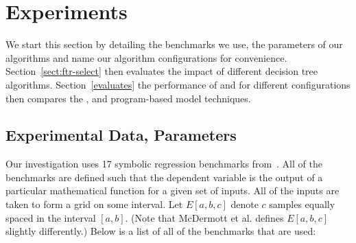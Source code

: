
\section{Experiments}\label{sect:experiments}

We start this section by detailing the benchmarks we use, the parameters of our algorithms and name our algorithm configurations for convenience. Section~\ref{sect:ftr-select} then evaluates the impact of different decision tree algorithms. Section~\ref{evaluates} the performance of \FULL and \DRAW for different configurations then compares the \FULL, \DRAW and program-based model techniques.
 
\subsection{Experimental Data, Parameters}\label{sect:data_sets}

Our investigation uses 17 symbolic regression benchmarks from~\cite{benchmarks}. All of the benchmarks are defined such that the dependent variable is the output of a particular mathematical function for a given set of inputs.  All of the inputs are taken to form a grid on some interval.  Let $E[a, b, c]$ denote $c$ samples equally spaced in the interval $[a,b]$. (Note that McDermott et al. defines $E[a, b, c]$ slightly differently.)  Below is a list of all of the benchmarks that are used:


